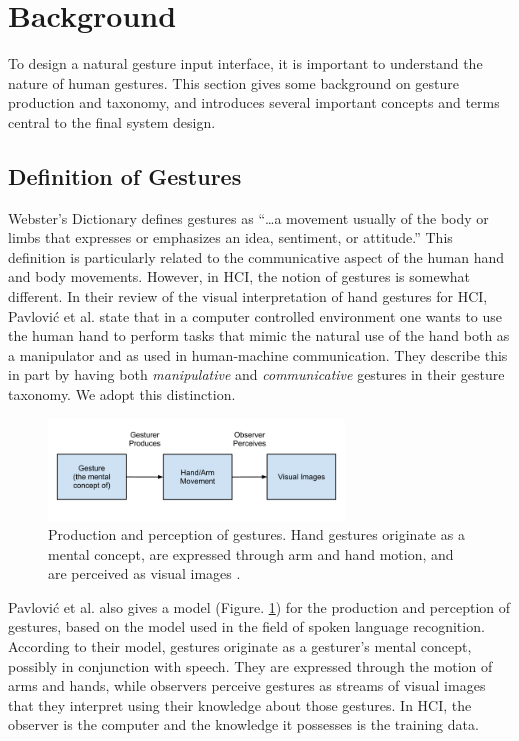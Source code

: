 \section{Background}
To design a natural gesture input interface, it is important to understand the
nature of human gestures. This section gives some background on
gesture production and taxonomy, and introduces several important concepts and
terms central to the final system design.
 
\subsection{Definition of Gestures}
Webster's Dictionary defines gestures as ``\ldots a movement usually of the body or limbs
that expresses or emphasizes an idea, sentiment, or attitude.'' This definition
is particularly related to the communicative aspect of the human hand and body
movements. However, in HCI, the notion
of gestures is somewhat different. In their review of the visual interpretation
of hand gestures for HCI, Pavlovi\'{c} et al. \cite{Pavlovic97} state that in a
computer controlled environment one wants to use the human hand to perform tasks that
mimic the natural use of the hand both as a manipulator and as used in
human-machine communication. They describe this in part by having both
\textit{manipulative} and \textit{communicative} gestures in their gesture taxonomy. We adopt this
distinction.

\begin{figure}[tbh]
  \centering
  \includegraphics[width=0.7\textwidth]{figures/gesture_production.png} 
  \caption{Production and perception of gestures. Hand gestures originate as a
  mental concept, are expressed through arm and hand motion, and are perceived
  as visual images \cite{Pavlovic97}.}
  \label{fig:gesture_production}
\end{figure}

Pavlovi\'{c} et al. \cite{Pavlovic97} also gives a model (Figure. 
\ref{fig:gesture_production}) for the production and perception of gestures, 
based on the model used in the field of spoken language recognition. According 
to their model, gestures originate as a gesturer's mental concept, possibly in 
conjunction with speech. They are expressed through the motion of arms and 
hands, while observers perceive gestures as streams of visual images that they
interpret using their knowledge about those gestures. In HCI, the 
observer is the computer and the knowledge it possesses is the training data.

